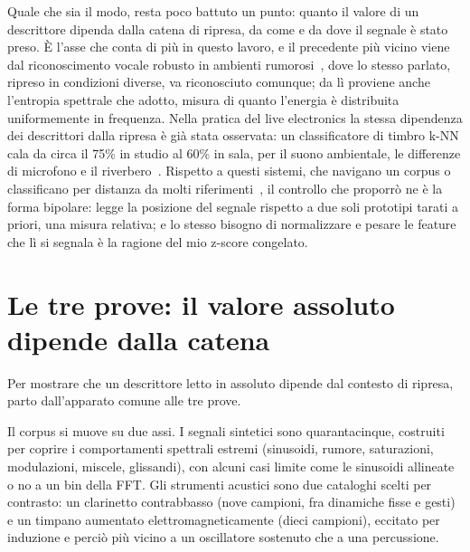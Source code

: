 \documentclass{article}
\begin{document}
Quale che sia il modo, resta poco battuto un punto: quanto il valore di un descrittore dipenda dalla catena di ripresa, da come e da dove il segnale è stato preso. È l'asse che conta di più in questo lavoro, e il precedente più vicino viene dal riconoscimento vocale robusto in ambienti rumorosi~\cite{shen1998robust,misra2004spectral}, dove lo stesso parlato, ripreso in condizioni diverse, va riconosciuto comunque; da lì proviene anche l'entropia spettrale che adotto, misura di quanto l'energia è distribuita uniformemente in frequenza. Nella pratica del live electronics la stessa dipendenza dei descrittori dalla ripresa è già stata osservata: un classificatore di timbro k-NN cala da circa il 75\% in studio al 60\% in sala, per il suono ambientale, le differenze di microfono e il riverbero~\cite{bullock2008implementing}. Rispetto a questi sistemi, che navigano un corpus o classificano per distanza da molti riferimenti~\cite{schwarz2006catart,bullock2008implementing}, il controllo che proporrò ne è la forma bipolare: legge la posizione del segnale rispetto a due soli prototipi tarati a priori, una misura relativa; e lo stesso bisogno di normalizzare e pesare le feature che lì si segnala è la ragione del mio z-score congelato. %

\section{Le tre prove: il valore assoluto dipende dalla catena}\label{sec:basale}

Per mostrare che un descrittore letto in assoluto dipende dal contesto di ripresa, parto dall'apparato comune alle tre prove. %


Il corpus si muove su due assi. I segnali sintetici sono quarantacinque, costruiti per coprire i comportamenti spettrali estremi (sinusoidi, rumore, saturazioni, modulazioni, miscele, glissandi), con alcuni casi limite come le sinusoidi allineate o no a un bin della FFT. Gli strumenti acustici sono due cataloghi scelti per contrasto: un clarinetto contrabbasso (nove campioni, fra dinamiche fisse e gesti) e un timpano aumentato elettromagneticamente (dieci campioni), eccitato per induzione e perciò più vicino a un oscillatore sostenuto che a una percussione.
\end{document}
